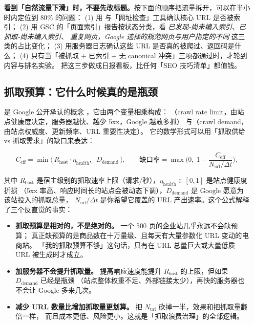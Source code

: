 \begin{keypoint}
\textbf{看到「自然流量下滑」时，不要先改标题。}按下面的顺序把流量拆开，可以在半小时内定位到 80\% 的问题：
(1) 用  与「网址检查」工具确认核心 URL 是否被索引；
(2) 用 GSC 的「页面索引」报告按状态分类，看 \emph{已发现-尚未编入索引}、\emph{已抓取-尚未编入索引}、
\emph{重复网页，Google 选择的规范网页与用户指定的不同} 这三类的占比变化；
(3) 用服务器日志确认这些 URL 是否真的被爬过、返回码是什么；
(4) 只有当「被抓取 + 已索引 + 无 canonical 冲突」三项都通过时，才轮到内容与排名实验。
把这三步做成日报看板，比任何「SEO 技巧清单」都值钱。
\end{keypoint}

\subsection{抓取预算：它什么时候真的是瓶颈}

 是 Google 公开承认的概念 \cite{google2024seostarter}，它由两个变量相乘构成：
（crawl rate limit，由站点健康度决定，服务器越快、越少 5xx，Google 越敢多抓）
与（crawl demand，由站点权威度、更新频率、URL 重要性决定）。
它的数学形式可以用「抓取供给 vs 抓取需求」的缺口来表达：

\begin{equation}
C_{\text{eff}} = \min\Big(\, R_{\text{host}} \cdot \eta_{\text{health}} ,\;\; D_{\text{demand}} \,\Big) ,
\qquad
\text{缺口率} = \max\Big(0,\; 1 - \frac{C_{\text{eff}}}{N_{\text{url}} / \Delta t}\Big) ,
\label{eq:crawlbudget}
\end{equation}

其中 $R_{\text{host}}$ 是宿主级别的抓取速率上限（请求/秒），$\eta_{\text{health}} \in [0,1]$ 是站点健康度折损
（5xx 率高、响应时间长的站点会被动态下调），$D_{\text{demand}}$ 是 Google 愿意为该站投入的抓取总量，
$N_{\text{url}}/\Delta t$ 是你希望它覆盖的 URL 产出速率。这个公式解释了三个反直觉的事实：

\begin{itemize}
  \item \textbf{抓取预算是相对的，不是绝对的。} 一个 500 页的企业站几乎永远不会缺预算；
        真正缺预算的是商品数在十万量级、且每天有大量参数化 URL 变动的电商站。
        「我的抓取预算不够」这句话，只有在 URL 总量巨大或大量低质 URL 被生成时才成立。
  \item \textbf{加服务器不会提升抓取量。} 提高响应速度能提升 $R_{\text{host}}$ 的上限，但如果 $D_{\text{demand}}$ 已经是瓶颈
        （站点整体权重不足、外部链接太少），再快的服务器也不会让 Google 多来几次。
  \item \textbf{减少 URL 数量比增加抓取量更划算。} 把 $N_{\text{url}}$ 砍掉一半，效果和把抓取量翻倍一样，
        而且成本更低、风险更小。这就是「抓取浪费治理」的全部逻辑。
\end{itemize}


